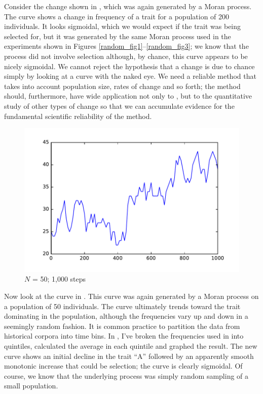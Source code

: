 \documentclass[output=paper]{langsci/langscibook}
\begin{document}
Consider the change shown in , which was again
generated by a Moran process.  The curve shows a change in frequency
of a trait for a population of 200 individuals. It looks sigmoidal,
which we would expect if the trait was being selected for, but it was
generated by the same Moran process used in the experiments shown in
Figures \ref{random_fig1}--\ref{random_fig3}; we know that the process
did not involve selection although, by chance, this curve appears to
be nicely sigmoidal.  We cannot reject the hypothesis that a change is
due to chance simply by looking at a curve with the naked eye.  We
need a reliable method that takes into account population size, rates
of change and so forth; the method should, furthermore, have wide
application not only to , but to the quantitative study
of other types of change so that we can accumulate evidence for the
fundamental scientific reliability of the method.

\begin{figure}[ht]
  \centering
  \includegraphics[width=.8\linewidth]{./img/jaggedy.pdf}
  \caption{$N$ = 50; 1,000 steps}
  \label{jaggedy}
\end{figure}

Now look at the curve in .  This curve was again
generated by a Moran process on a population of 50 individuals.  The
curve ultimately trends toward the trait dominating in the population,
although the frequencies vary up and down in a seemingly random
fashion.  It is common practice to partition the data from historical
corpora into time bins.  In , I've broken the
frequencies used in  into quintiles, calculated
the average in each quintile and graphed the result.  The new curve
shows an initial decline in the trait ``A'' followed by an apparently
smooth monotonic increase that could be selection; the curve is
clearly sigmoidal.  Of course, we know that the underlying process was
simply random sampling of a small population.
\end{document}
